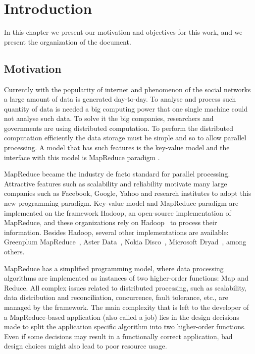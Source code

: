 \chapter{Introduction} %
\label{cha:introduction}

In this chapter we present our motivation and objectives for this work, and we
present the organization of the document.

\section{Motivation}

Currently with the popularity of internet and phenomenon of the social
networks a large amount of data is generated day-to-day. To analyse and
process such quantity of data is needed a big computing power that one
single machine could not analyse such data. To solve it the big companies,
researchers and governments are using distributed computation. To perform
the distributed computation efficiently the data storage must be simple
and so to allow parallel processing. A model that has such features
is the key-value model and the interface with this model is MapReduce
paradigm \cite{Dean:2004}.

MapReduce became the industry de facto standard for parallel processing.
Attractive features such as scalability and reliability motivate many large companies
such as Facebook, Google, Yahoo and research institutes to adopt this new programming
paradigm. Key-value model and MapReduce paradigm are implemented on the framework
Hadoop, an open-source implementation of MapReduce, and these organizations rely
on Hadoop~\cite{White:2009} to process their information. Besides Hadoop, several
other implementations are available: Greenplum MapReduce~\cite{Greenplum:2008},
Aster Data~\cite{Aster:2011}, Nokia Disco~\cite{Mundkur:2011}, 
Microsoft Dryad~\cite{Isard:2007}, among others.

MapReduce has a simplified programming model, where data processing algorithms 
are implemented as instances of two higher-order functions: Map and Reduce. All 
complex issues related to distributed processing, such as scalability, data
distribution and reconciliation, concurrence, fault tolerance, etc., are managed
by the framework. The main complexity that is left to the developer of a 
MapReduce-based application (also called a job) lies in the design decisions made 
to split the application specific algorithm into two higher-order functions. Even
if some decisions may result in a functionally correct application, bad design
choices might also lead to poor resource usage.

